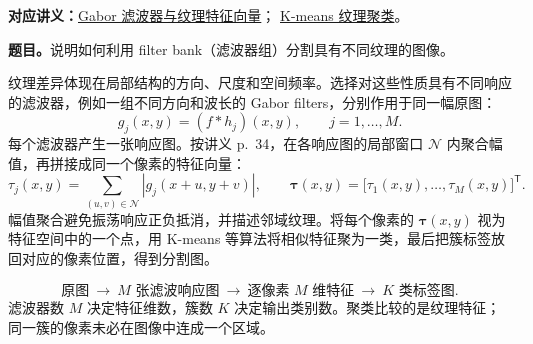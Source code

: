 
\begingroup
\renewcommand{\recordid}[1]{}
\renewcommand{\relatedtopic}[2]{\hyperref[topic:#1]{#2}}

\label{tutorial:SC4061-TUT05}



\textbf{对应讲义：}\relatedtopic{SC4061-L08-T01}{Gabor 滤波器与纹理特征向量}；
\relatedtopic{SC4061-L08-T02}{K-means 纹理聚类}。

\textbf{题目。}说明如何利用 filter bank（滤波器组）分割具有不同纹理的图像。

\begin{checkedsolution}
纹理差异体现在局部结构的方向、尺度和空间频率。选择对这些性质具有不同响应的滤波器，例如一组不同方向和波长的 Gabor filters，分别作用于同一幅原图：
\[
  g_j(x,y)=(f*h_j)(x,y),\qquad j=1,\ldots,M.
\]
每个滤波器产生一张响应图。按讲义 p.~34，在各响应图的局部窗口 $\mathcal N$ 内聚合幅值，再拼接成同一个像素的特征向量：
\[
  \tau_j(x,y)=\sum_{(u,v)\in\mathcal N}|g_j(x+u,y+v)|,\qquad
  \bm\tau(x,y)=\bigl[\tau_1(x,y),\ldots,\tau_M(x,y)\bigr]^{\mathsf T}.
\]
幅值聚合避免振荡响应正负抵消，并描述邻域纹理。将每个像素的 $\bm\tau(x,y)$ 视为特征空间中的一个点，用 K-means 等算法将相似特征聚为一类，最后把簇标签放回对应的像素位置，得到分割图。

\[
  \boxed{\text{原图}}
  \ \longrightarrow\ \boxed{M\text{ 张滤波响应图}}
  \ \longrightarrow\ \boxed{\text{逐像素 }M\text{ 维特征}}
  \ \longrightarrow\ \boxed{K\text{ 类标签图}}.
\]
滤波器数 $M$ 决定特征维数，簇数 $K$ 决定输出类别数。聚类比较的是纹理特征；同一簇的像素未必在图像中连成一个区域。
\end{checkedsolution}


